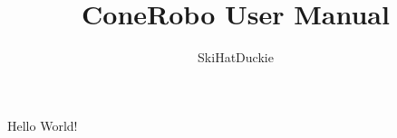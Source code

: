 \documentclass[11pt]{article}
\title{ConeRobo User Manual}
\author{SkiHatDuckie}
\begin{document}
   \maketitle
   Hello World!
\end{document}
